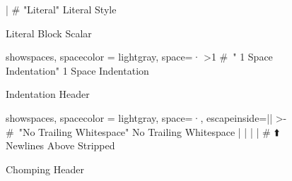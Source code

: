 \begin{figure}[H]
  \begin{minipage}[t]{0.48\textwidth}
    \vspace{0pt}
    \begin{bchart}[max=9, width=0.85\textwidth]
    \end{bchart}
  \end{minipage}
  \begin{minipage}[t]{0.48\textwidth}
    \vspace{0pt}
    \begin{yamlcode}
      | # "Literal\nStyle"
        Literal
        Style
    \end{yamlcode}
  \end{minipage}
  \caption{Literal Block Scalar}
\end{figure}

\begin{figure}[H]
  \begin{minipage}[t]{0.48\textwidth}
    \vspace{0pt}
    \begin{bchart}[max=9, width=0.85\textwidth]
    \end{bchart}
  \end{minipage}
  \begin{minipage}[t]{0.48\textwidth}
    \vspace{0pt}
    \begin{yamlcode*}{showspaces, spacecolor = lightgray, space=·}
      >1 # "  1 Space Indentation"
         1 Space Indentation
    \end{yamlcode*}
  \end{minipage}
  \caption{Indentation Header}
\end{figure}

\begin{figure}[H]
  \begin{minipage}[t]{0.48\textwidth}
    \vspace{0pt}
    \begin{bchart}[max=9, width=0.85\textwidth]
    \end{bchart}
  \end{minipage}
  \begin{minipage}[t]{0.48\textwidth}
    \vspace{0pt}
    \begin{yamlcode*}{showspaces, spacecolor = lightgray, space=·, escapeinside=||}
      >- # "No Trailing Whitespace"
         No Trailing Whitespace
        | |
        | |
      # ⬆️ Newlines Above Stripped
    \end{yamlcode*}
  \end{minipage}
  \caption{Chomping Header}
\end{figure}

